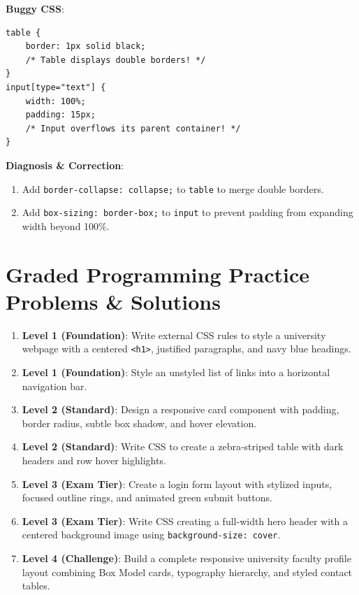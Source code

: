 \begin{debuggingbox}
\textbf{Buggy CSS}:
\begin{lstlisting}[language=CSS3]
table {
    border: 1px solid black;
    /* Table displays double borders! */
}
input[type="text"] {
    width: 100%;
    padding: 15px;
    /* Input overflows its parent container! */
}
\end{lstlisting}
\textbf{Diagnosis \& Correction}:
\begin{enumerate}
    \item Add \texttt{border-collapse: collapse;} to \texttt{table} to merge double borders.
    \item Add \texttt{box-sizing: border-box;} to \texttt{input} to prevent padding from expanding width beyond 100\%.
\end{enumerate}
\end{debuggingbox}

\section{Graded Programming Practice Problems \& Solutions}

\begin{practiceset}
\begin{enumerate}[leftmargin=1.5em]
    \item \textbf{Level 1 (Foundation)}: Write external CSS rules to style a university webpage with a centered \texttt{<h1>}, justified paragraphs, and navy blue headings.
    \item \textbf{Level 1 (Foundation)}: Style an unstyled list of links into a horizontal navigation bar.
    \item \textbf{Level 2 (Standard)}: Design a responsive card component with padding, border radius, subtle box shadow, and hover elevation.
    \item \textbf{Level 2 (Standard)}: Write CSS to create a zebra-striped table with dark headers and row hover highlights.
    \item \textbf{Level 3 (Exam Tier)}: Create a login form layout with stylized inputs, focused outline rings, and animated green submit buttons.
    \item \textbf{Level 3 (Exam Tier)}: Write CSS creating a full-width hero header with a centered background image using \texttt{background-size: cover}.
    \item \textbf{Level 4 (Challenge)}: Build a complete responsive university faculty profile layout combining Box Model cards, typography hierarchy, and styled contact tables.
\end{enumerate}
\end{practiceset}

